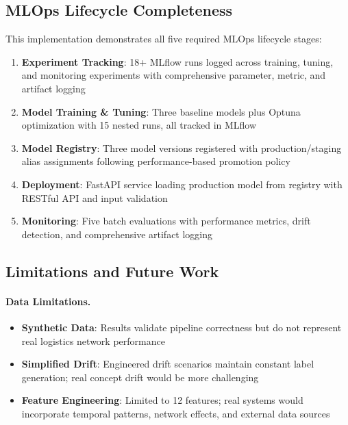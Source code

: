 \documentclass[11pt,a4paper]{article}
\begin{document}
\subsection{MLOps Lifecycle Completeness}

This implementation demonstrates all five required MLOps lifecycle stages:

\begin{enumerate}
    \item \textbf{Experiment Tracking}: 18+ MLflow runs logged across training, tuning, and monitoring experiments with comprehensive parameter, metric, and artifact logging
    
    \item \textbf{Model Training \& Tuning}: Three baseline models plus Optuna optimization with 15 nested runs, all tracked in MLflow
    
    \item \textbf{Model Registry}: Three model versions registered with production/staging alias assignments following performance-based promotion policy
    
    \item \textbf{Deployment}: FastAPI service loading production model from registry with RESTful API and input validation
    
    \item \textbf{Monitoring}: Five batch evaluations with performance metrics, drift detection, and comprehensive artifact logging
\end{enumerate}

\subsection{Limitations and Future Work}

\paragraph{Data Limitations.}
\begin{itemize}
    \item \textbf{Synthetic Data}: Results validate pipeline correctness but do not represent real logistics network performance
    \item \textbf{Simplified Drift}: Engineered drift scenarios maintain constant label generation; real concept drift would be more challenging
    \item \textbf{Feature Engineering}: Limited to 12 features; real systems would incorporate temporal patterns, network effects, and external data sources
\end{itemize}
\end{document}
